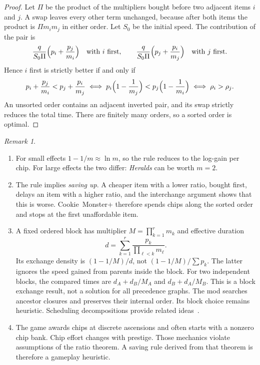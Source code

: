 \documentclass[11pt,a4paper]{article}
\numberwithin{equation}{section}
\theoremstyle{definition}
\theoremstyle{remark}
\newtheorem{remark}[theorem]{Remark}
\begin{document}
\begin{proof}
Let $\Pi$ be the product of the multipliers bought before two adjacent items $i$ and $j$. A swap leaves every other term unchanged, because after both items the product is $\Pi m_im_j$ in either order. Let $S_0$ be the initial speed. The contribution of the pair is
\[
 \frac q{S_0\Pi}\Bigl(p_i+\frac{p_j}{m_i}\Bigr)\quad\text{with $i$ first},\qquad
 \frac q{S_0\Pi}\Bigl(p_j+\frac{p_i}{m_j}\Bigr)\quad\text{with $j$ first}.
\]
Hence $i$ first is strictly better if and only if
\[
 p_i+\frac{p_j}{m_i}<p_j+\frac{p_i}{m_j}
 \iff p_i\Bigl(1-\frac1{m_j}\Bigr)<p_j\Bigl(1-\frac1{m_i}\Bigr)
 \iff\rho_i>\rho_j.
\]
An unsorted order contains an adjacent inverted pair, and its swap strictly reduces the total time. There are finitely many orders, so a sorted order is optimal.
\end{proof}

\begin{remark}\label{rem:chips}
\leavevmode
\begin{enumerate}
\item For small effects $1-1/m\approx\ln m$, so the rule reduces to the log-gain per chip. For large effects the two differ: \emph{Heralds} can be worth $m=2$.
\item The rule implies \emph{saving up}. A cheaper item with a lower ratio, bought first, delays an item with a higher ratio, and the interchange argument shows that this is worse. Cookie~Monster+ therefore spends chips along the sorted order and stops at the first unaffordable item.
\item A fixed ordered block has multiplier $M=\prod_{k=1}^r m_k$ and effective duration
\[
 d=\sum_{k=1}^r\frac{p_k}{\prod_{\ell<k}m_\ell}.
\]
Its exchange density is $(1-1/M)/d$, not $(1-1/M)/\sum p_k$. The latter ignores the speed gained from parents inside the block. For two independent blocks, the compared times are $d_A+d_B/M_A$ and $d_B+d_A/M_B$. This is a block exchange result, not a solution for all precedence graphs. The mod searches ancestor closures and preserves their internal order. Its block choice remains heuristic. Scheduling decompositions provide related ideas~\cite{sidney,lawler}.
\item The game awards chips at discrete ascensions and often starts with a nonzero chip bank. Chip effort changes with prestige. Those mechanics violate assumptions of the ratio theorem. A saving rule derived from that theorem is therefore a gameplay heuristic.
\end{enumerate}
\end{remark}
\end{document}
